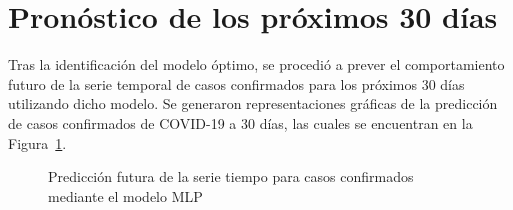 \documentclass[
  letterpaper,
  DIV=11,
  numbers=noendperiod]{scrreport}
\newenvironment{Shaded}{\begin{snugshade}}{\end{snugshade}}
\newcommand{\AttributeTok}[1]{\textcolor[rgb]{0.40,0.45,0.13}{#1}}
\newcommand{\DecValTok}[1]{\textcolor[rgb]{0.68,0.00,0.00}{#1}}
\newcommand{\FunctionTok}[1]{\textcolor[rgb]{0.28,0.35,0.67}{#1}}
\newcommand{\NormalTok}[1]{\textcolor[rgb]{0.00,0.23,0.31}{#1}}
\newcommand{\OtherTok}[1]{\textcolor[rgb]{0.00,0.23,0.31}{#1}}
\newcommand{\SpecialCharTok}[1]{\textcolor[rgb]{0.37,0.37,0.37}{#1}}
\newcommand{\StringTok}[1]{\textcolor[rgb]{0.13,0.47,0.30}{#1}}
\theoremstyle{plain}
\theoremstyle{definition}
\theoremstyle{definition}
\theoremstyle{plain}
\theoremstyle{remark}
\begin{document}
\section{Pronóstico de los próximos 30
días}\label{pronuxf3stico-de-los-pruxf3ximos-30-duxedas}

Tras la identificación del modelo óptimo, se procedió a prever el
comportamiento futuro de la serie temporal de casos confirmados para los
próximos 30 días utilizando dicho modelo. Se generaron representaciones
gráficas de la predicción de casos confirmados de COVID-19 a 30 días,
las cuales se encuentran en la Figura~\ref{fig-foremlp}.

\begin{Shaded}
\end{Shaded}

\begin{figure}


\caption{\label{fig-foremlp}Predicción futura de la serie tiempo para
casos confirmados mediante el modelo MLP}

\end{figure}%
\end{document}
